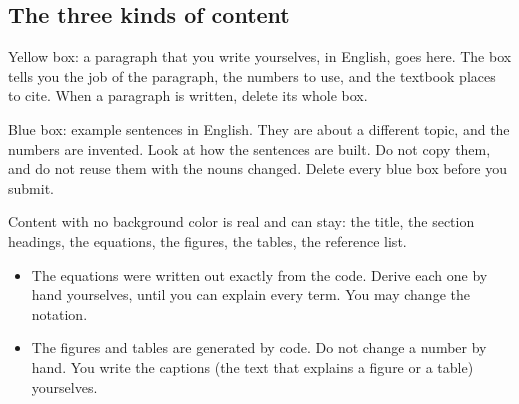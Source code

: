 \documentclass{article}
\newenvironment{pts}{\begin{itemize}[nosep,leftmargin=1.15em,topsep=1pt]}{\end{itemize}}
\begin{document}
\subsection*{The three kinds of content}
\begin{note}
Yellow box: a paragraph that you write yourselves, in English, goes here. The box tells you the job of the paragraph, the numbers to use, and the textbook places to cite. When a paragraph is written, delete its whole box.
\end{note}
\begin{model}
Blue box: example sentences in English. They are about a different topic, and the numbers are invented. Look at how the sentences are built. Do not copy them, and do not reuse them with the nouns changed. Delete every blue box before you submit.
\end{model}
Content with no background color is real and can stay: the title, the section headings, the equations, the figures, the tables, the reference list.
\begin{pts}
\item The equations were written out exactly from the code. Derive each one by hand yourselves, until you can explain every term. You may change the notation.
\item The figures and tables are generated by code. Do not change a number by hand. You write the captions (the text that explains a figure or a table) yourselves.
\end{pts}
\end{document}
